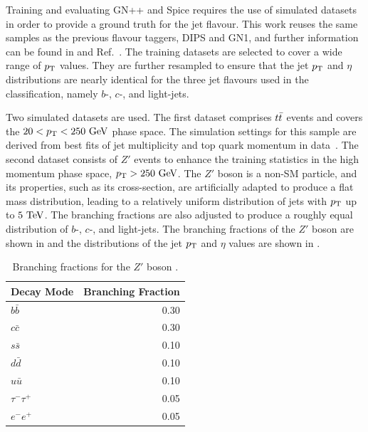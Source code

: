 Training and evaluating GN++ and Spice requires the use of simulated datasets in order to provide a ground truth for the jet flavour.
This work reuses the same samples as the previous flavour taggers, DIPS and GN1, and further information can be found in \textcite{AlexThesis} and Ref.~\cite{GN1}.
The training datasets are selected to cover a wide range of $p_\mathrm{T}$ values.
They are further resampled to ensure that the jet $p_\mathrm{T}$ and $\eta$ distributions are nearly identical for the three jet flavours used in the classification, namely $b$-, $c$-, and light-jets.

Two simulated datasets are used.
The first dataset comprises $t\bar{t}$ events and covers the $20 < \pt < 250~\GeV$ phase space.
The simulation settings for this sample are derived from best fits of jet multiplicity and top quark momentum in data~\cite{ttbar1, ttbar2}.
The second dataset consists of $Z'$ events to enhance the training statistics in the high momentum phase space, $\pt > 250~\GeV$.
The $Z'$ boson is a non-SM particle, and its properties, such as its cross-section, are artificially adapted to produce a flat mass distribution, leading to a relatively uniform distribution of jets with $p_\mathrm{T}$ up to $5~\TeV$.
The branching fractions are also adjusted to produce a roughly equal distribution of $b$-, $c$-, and light-jets.
The branching fractions of the $Z'$ boson are shown in  and the distributions of the jet $p_\mathrm{T}$ and $\eta$ values are shown in .

\begin{table}[ht]
    \centering
    \begin{tabular}{lr}
        \toprule
        Decay Mode     & Branching Fraction \\
        \midrule
        $b\bar{b}$     & 0.30               \\
        $c\bar{c}$     & 0.30               \\
        $s\bar{s}$     & 0.10               \\
        $d\bar{d}$     & 0.10               \\
        $u\bar{u}$     & 0.10               \\
        $\tau^-\tau^+$ & 0.05               \\
        $e^-e^+$       & 0.05               \\
        \bottomrule
    \end{tabular}
    \caption{Branching fractions for the $Z'$ boson \cite{Run2FTAlgs}.}
    \label{tab:zprime_branching}
\end{table}


